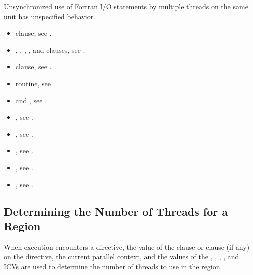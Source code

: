 \begin{fortranspecific}
Unsynchronized use of Fortran I/O statements by multiple threads on the same unit
has unspecified behavior.
\end{fortranspecific}

\crossreferences
\begin{itemize}
\item {} clause, see .

\item {}, , , , and  clauses, see
.

\item {} clause, see
.

\item {} routine, see
.

\item {} and , see
  .

\item {}, see
  .

\item {}, see
  .

\item {}, see
  .

\item {},
  see .

\item {}, see
  .

\end{itemize}











\subsection{Determining the Number of Threads for a  Region}
\label{subsec:Determining the Number of Threads for a parallel Region}
When execution encounters a  directive, the value of the  clause or
 clause (if any) on the directive, the current parallel context, and the
values of the , , ,
, and 
ICVs are used to determine the number of threads to use in the region.

